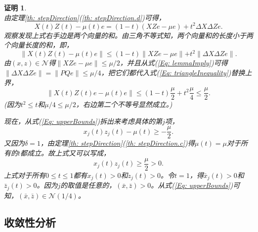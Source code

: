 \documentclass{ctexart}
\numberwithin{equation}{section} %
\newtheorem*{Proof}{证明}
\begin{document}
\begin{Proof}
\begin{equation}
	\end{equation}
	由定理\ref{th: stepDirection}(\ref{th: stepDirection.d})可得，
	\begin{equation}
		X\left(t\right)Z\left(t\right) - \mu\left(t\right)e = \left(1 - t\right)\left(XZe - \mu e\right) + t^2\Delta X\Delta Ze. \nonumber
	\end{equation}
	观察发现上式右手边是两个向量的和。由三角不等式知，两个向量和的长度小于两个向量长度的和，即，
	\begin{equation}
		\label{Eq: triangleInequality}
		\parallel X\left(t\right)Z\left(t\right) - \mu\left(t\right)e \parallel \leq \left(1 - t\right)\parallel XZe - \mu e \parallel + t^2\parallel \Delta X\Delta Ze \parallel. 
	\end{equation}
	由$ \left(x, z\right) \in \mathcal{N} $得$ \parallel XZe - \mu e \parallel \leq \mu/2 $，并且从式(\ref{Eq: lemmaImply})可得$ \parallel \Delta X \Delta Ze \parallel = \parallel PQe \parallel \leq \mu/4 $，把它们都代入式(\ref{Eq: triangleInequality})替换上界，
	\begin{equation}
		\label{Eq: upperBounds}
		\parallel X\left(t\right)Z\left(t\right)e - \mu\left(t\right)e \parallel \leq \left(1 - t\right)\frac{\mu}{2} + t^2\frac{\mu}{4} \leq \frac{\mu}{2}.
	\end{equation}
	(因为$ t^2 \leq t $和$ \mu/4 \leq \mu/2 $，右边第二个不等号显然成立。)
	
	现在，从式(\ref{Eq: upperBounds})拆出来考虑具体的第$ j $项，
	\begin{equation}
		x_j\left(t\right)z_j\left(t\right) - \mu\left(t\right) \geq -\frac{\mu}{2}. \nonumber
	\end{equation}
	又因为$ \delta = 1 $，由定理\ref{th: stepDirection}(\ref{th: stepDirection.c})得$ \mu\left(t\right) = \mu $对于所有的$ t $都成立。故上式又可以写成，
	\begin{equation}
		x_j\left(t\right)z_j\left(t\right) \geq \frac{\mu}{2} > 0.
	\end{equation}
	上式对于所有$ 0 \leq t \leq 1 $都有$ x_j\left(t\right) > 0 $和$ z_j\left(t\right) > 0 $。令$ t = 1 $，得$ \bar{x}_j\left(t\right) > 0 $和$ \bar{z}_j\left(t\right) > 0 $。因为$ j $的取值是任意的，$ \left(\bar{x}, \bar{z}\right) > 0 $。从式(\ref{Eq: upperBounds})可知，$ \left(\bar{x}, \bar{z}\right) \in \mathcal{N}\left(1/4\right) $。
\end{Proof}

\subsection{收敛性分析}
\end{document}
